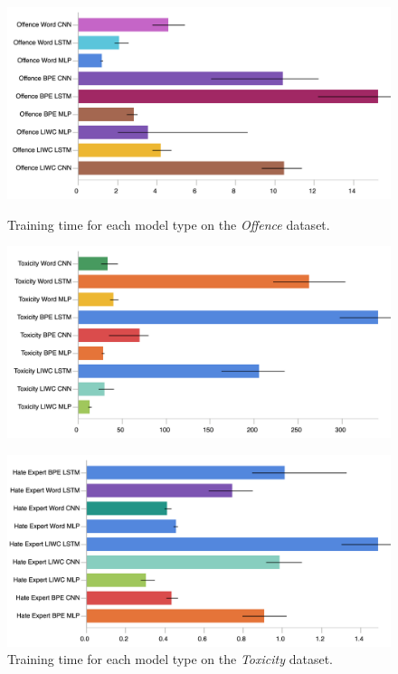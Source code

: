 \begin{figure}[h]
  \begin{minipage}{0.49\textwidth}
    \centering
    \includegraphics[width=\textwidth]{davidson_train_time.pdf}
    \caption{Training time for each model type on the \textit{Offence} dataset.}
    \label{fig:davidson_train_time}
    \vfill
    \includegraphics[width=\textwidth]{wulczyn_train_time.pdf}
    \caption{Training time for each model type on the \textit{Toxicity} dataset.}
    \label{fig:wulczyn_train_time}
  \end{minipage}%
  \hfill
  \begin{minipage}{0.49\textwidth}
    \centering
    \includegraphics[width=\textwidth]{waseem_train_time.pdf}

\end{minipage}
\end{figure}

